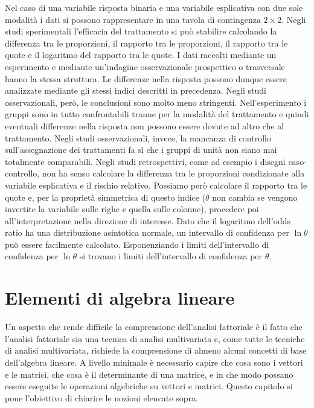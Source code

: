 \documentclass[
  11pt,
]{krantz}
\theoremstyle{definition}
\theoremstyle{definition}
\theoremstyle{definition}
\theoremstyle{definition}
\theoremstyle{remark}
\begin{document}
Nel caso di una variabile risposta binaria e una variabile esplicativa con due sole modalità i dati si possono rappresentare in una tavola di contingenza \(2 \times 2\). Negli studi sperimentali l'efficacia del trattamento si può stabilire calcolando la differenza tra le proporzioni, il rapporto tra le proporzioni, il rapporto tra le quote e il logaritmo del rapporto tra le quote. I dati raccolti mediante un esperimento e mediante un'indagine osservazionale prospettico o trasversale hanno la stessa struttura. Le differenze nella risposta possono dunque essere analizzate mediante gli stessi indici descritti in precedenza. Negli studi osservazionali, però, le conclusioni sono molto meno stringenti. Nell'esperimento i gruppi sono in tutto confrontabili tranne per la modalità del trattamento e quindi eventuali differenze nella risposta non possono essere dovute ad altro che al trattamento. Negli studi osservazionali, invece, la mancanza di controllo sull'assegnazione dei trattamenti fa sì che i gruppi di unità non siano mai totalmente comparabili. Negli studi retrospettivi, come ad esempio i disegni caso-controllo, non ha senso calcolare la differenza tra le proporzioni condizionate alla variabile esplicativa e il rischio relativo. Possiamo però calcolare il rapporto tra le quote e, per la proprietà simmetrica di questo indice (\(\theta\) non cambia se vengono invertite la variabile sulle righe e quella sulle colonne), procedere poi all'interpretazione nella direzione di interesse. Dato che il logaritmo dell'odds ratio ha una distribuzione asintotica normale, un intervallo di confidenza per \(\ln \theta\) può essere facilmente calcolato. Esponenziando i limiti dell'intervallo di confidenza per \(\ln \theta\) si trovano i limiti dell'intervallo di confidenza per \(\theta\).

\hypertarget{ch:lin-alg}{%
\chapter{Elementi di algebra lineare}\label{ch:lin-alg}}

Un aspetto che rende difficile la comprensione dell'analisi fattoriale è il fatto che l'analisi fattoriale sia una tecnica di analisi multivariata e, come tutte le tecniche di analisi multivariata, richiede la comprensione di almeno alcuni concetti di base dell'algebra lineare. A livello minimale è necessario capire che cosa sono i vettori e le matrici, che cosa è il determinante di una matrice, e in che modo possano essere eseguite le operazioni algebriche su vettori e matrici. Questo capitolo si pone l'obiettivo di chiarire le nozioni elencate sopra.
\end{document}
